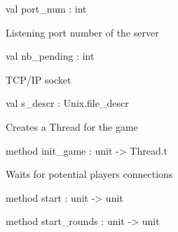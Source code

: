 \documentclass[11pt]{article}
\begin{document}
\begin{ocamldocobjectend}


\label{val:Server.server.port-underscorenum}\begin{ocamldoccode}
val port_num : int
\end{ocamldoccode}
\begin{ocamldocdescription}
Listening port number of the server


\end{ocamldocdescription}


\label{val:Server.server.nb-underscorepending}\begin{ocamldoccode}
val nb_pending : int
\end{ocamldoccode}
\begin{ocamldocdescription}
TCP/IP socket


\end{ocamldocdescription}


\label{val:Server.server.s-underscoredescr}\begin{ocamldoccode}
val s_descr : Unix.file_descr
\end{ocamldoccode}
\begin{ocamldocdescription}
Creates a Thread for the game


\end{ocamldocdescription}


\label{method:Server.server.init-underscoregame}\begin{ocamldoccode}
method init_game : unit -> Thread.t
\end{ocamldoccode}
\begin{ocamldocdescription}
Waits for potential players connections


\end{ocamldocdescription}


\label{method:Server.server.start}\begin{ocamldoccode}
method start : unit -> unit
\end{ocamldoccode}


\label{method:Server.server.start-underscorerounds}\begin{ocamldoccode}
method start_rounds : unit -> unit
\end{ocamldoccode}
\end{ocamldocobjectend}
\end{document}
